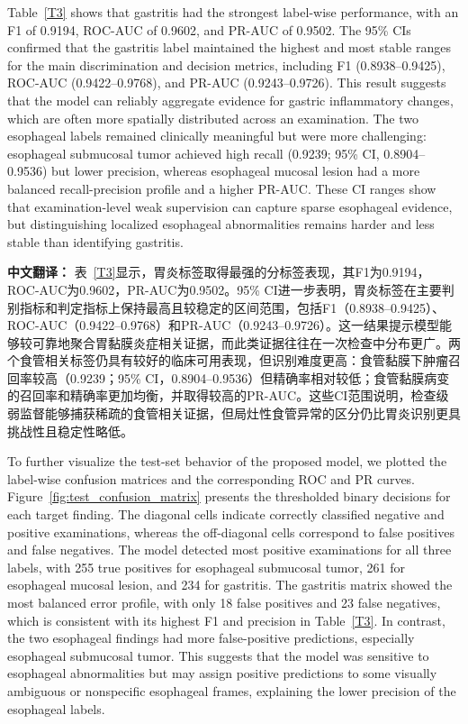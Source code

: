 \documentclass[Afour,sagev,times]{sagej}
\begin{document}
Table~\ref{T3} shows that gastritis had the strongest label-wise performance, with an F1 of 0.9194, ROC-AUC of 0.9602, and PR-AUC of 0.9502. The 95\% CIs confirmed that the gastritis label maintained the highest and most stable ranges for the main discrimination and decision metrics, including F1 (0.8938--0.9425), ROC-AUC (0.9422--0.9768), and PR-AUC (0.9243--0.9726). This result suggests that the model can reliably aggregate evidence for gastric inflammatory changes, which are often more spatially distributed across an examination. The two esophageal labels remained clinically meaningful but were more challenging: esophageal submucosal tumor achieved high recall (0.9239; 95\% CI, 0.8904--0.9536) but lower precision, whereas esophageal mucosal lesion had a more balanced recall-precision profile and a higher PR-AUC. These CI ranges show that examination-level weak supervision can capture sparse esophageal evidence, but distinguishing localized esophageal abnormalities remains harder and less stable than identifying gastritis.

\textbf{中文翻译：} 表~\ref{T3}显示，胃炎标签取得最强的分标签表现，其F1为0.9194，ROC-AUC为0.9602，PR-AUC为0.9502。95\% CI进一步表明，胃炎标签在主要判别指标和判定指标上保持最高且较稳定的区间范围，包括F1（0.8938--0.9425）、ROC-AUC（0.9422--0.9768）和PR-AUC（0.9243--0.9726）。这一结果提示模型能够较可靠地聚合胃黏膜炎症相关证据，而此类证据往往在一次检查中分布更广。两个食管相关标签仍具有较好的临床可用表现，但识别难度更高：食管黏膜下肿瘤召回率较高（0.9239；95\% CI，0.8904--0.9536）但精确率相对较低；食管黏膜病变的召回率和精确率更加均衡，并取得较高的PR-AUC。这些CI范围说明，检查级弱监督能够捕获稀疏的食管相关证据，但局灶性食管异常的区分仍比胃炎识别更具挑战性且稳定性略低。

To further visualize the test-set behavior of the proposed model, we plotted the label-wise confusion matrices and the corresponding ROC and PR curves. Figure~\ref{fig:test_confusion_matrix} presents the thresholded binary decisions for each target finding. The diagonal cells indicate correctly classified negative and positive examinations, whereas the off-diagonal cells correspond to false positives and false negatives. The model detected most positive examinations for all three labels, with 255 true positives for esophageal submucosal tumor, 261 for esophageal mucosal lesion, and 234 for gastritis. The gastritis matrix showed the most balanced error profile, with only 18 false positives and 23 false negatives, which is consistent with its highest F1 and precision in Table~\ref{T3}. In contrast, the two esophageal findings had more false-positive predictions, especially esophageal submucosal tumor. This suggests that the model was sensitive to esophageal abnormalities but may assign positive predictions to some visually ambiguous or nonspecific esophageal frames, explaining the lower precision of the esophageal labels.
\end{document}
